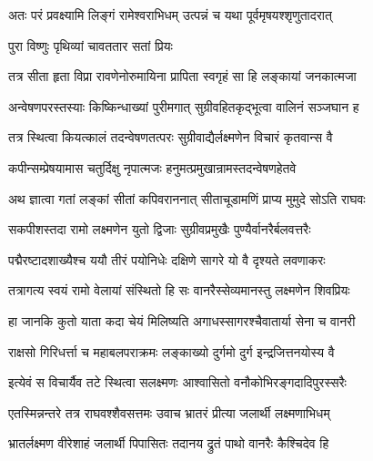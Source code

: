 

\textlink{}
\translink{}

\storymeta


\twolineshloka
{अतः परं प्रवक्ष्यामि लिङ्गं रामेश्वराभिधम्} 
{उत्पन्नं च यथा पूर्वमृषयश्शृणुतादरात्}

\onelineshloka
{पुरा विष्णुः पृथिव्यां चावततार सतां प्रियः} %

\twolineshloka
{तत्र सीता हृता विप्रा रावणेनोरुमायिना} 
{प्रापिता स्वगृहं सा हि लङ्कायां जनकात्मजा} %

\twolineshloka
{अन्वेषणपरस्तस्याः किष्किन्धाख्यां पुरीमगात्} 
{सुग्रीवहितकृद्भूत्वा वालिनं सञ्जघान ह} %

\twolineshloka
{तत्र स्थित्वा कियत्कालं तदन्वेषणतत्परः} 
{सुग्रीवाद्यैर्लक्ष्मणेन विचारं कृतवान्स वै} %

\twolineshloka
{कपीन्सम्प्रेषयामास चतुर्दिक्षु नृपात्मजः} 
{हनुमत्प्रमुखान्रामस्तदन्वेषणहेतवे} %

\twolineshloka
{अथ ज्ञात्वा गतां लङ्कां सीतां कपिवराननात्} 
{सीताचूडामणिं प्राप्य मुमुदे सोऽति राघवः} %

\twolineshloka
{सकपीशस्तदा रामो लक्ष्मणेन युतो द्विजाः} 
{सुग्रीवप्रमुखैः पुण्यैर्वानरैर्बलवत्तरैः} %

\twolineshloka
{पद्मैरष्टादशाख्यैश्च ययौ तीरं पयोनिधेः}
{दक्षिणे सागरे यो वै दृश्यते लवणाकरः}

\twolineshloka
{तत्रागत्य स्वयं रामो वेलायां संस्थितो हि सः} 
{वानरैस्सेव्यमानस्तु लक्ष्मणेन शिवप्रियः} %

\twolineshloka
{हा जानकि कुतो याता कदा चेयं मिलिष्यति} 
{अगाधस्सागरश्चैवातार्या सेना च वानरी} %

\twolineshloka
{राक्षसो गिरिधर्त्ता च महाबलपराक्रमः}
{लङ्काख्यो दुर्गमो दुर्ग इन्द्रजित्तनयोस्य वै} %

\twolineshloka
{इत्येवं स विचार्यैव तटे स्थित्वा सलक्ष्मणः}
{आश्वासितो वनौकोभिरङ्गदादिपुरस्सरैः} %

\twolineshloka
{एतस्मिन्नन्तरे तत्र राघवश्शैवसत्तमः}
{उवाच भ्रातरं प्रीत्या जलार्थी लक्ष्मणाभिधम्} %


\twolineshloka
{भ्रातर्लक्ष्मण वीरेशाहं जलार्थी पिपासितः}
{तदानय द्रुतं पाथो वानरैः कैश्चिदेव हि} %

